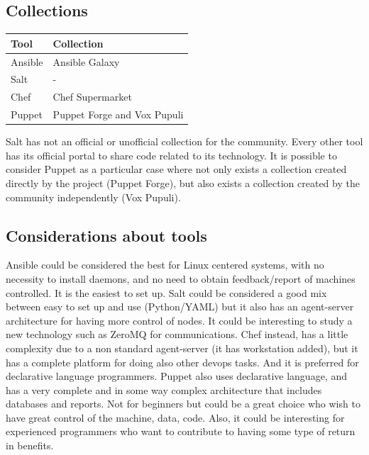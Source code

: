 \documentclass[12pt,a4paper,openright,twoside]{book}
\begin{document}
\subsection{Collections}
\begin{table}[H]
    \begin{tabular}{|l|l|}
    \hline
    \textbf{Tool} & \textbf{Collection}                            \\ \hline
    Ansible       & Ansible Galaxy                                 \\ \hline
    Salt          & -                                              \\ \hline
    Chef          & Chef Supermarket                               \\ \hline
    Puppet        & Puppet Forge and Vox Pupuli                    \\ \hline
    \end{tabular}
\end{table}
Salt has not an official or unofficial collection for the community.
Every other tool has its official portal to share code related to its technology.
It is possible to consider Puppet as a particular case where not only exists a collection created directly by the project (Puppet Forge), but also exists a collection created by the community independently (Vox Pupuli).

\subsection{Considerations about tools}
Ansible could be considered the best for Linux centered systems, with no necessity to install daemons, and no need to obtain feedback/report of machines controlled. It is the easiest to set up.
Salt could be considered a good mix between easy to set up and use (Python/YAML) but it also has an agent-server architecture for having more control of nodes. It could be interesting to study a new technology such as ZeroMQ for communications.
Chef instead, has a little complexity due to a non standard agent-server (it has workstation added), but it has a complete platform for doing also other devops tasks. And it is preferred for declarative language programmers.
Puppet also uses declarative language, and has a very complete and in some way complex architecture that includes databases and reports. Not for beginners but could be a great choice who wish to have great control of the machine, data, code. Also, it could be interesting for experienced programmers who want to contribute to having some type of return in benefits.
\end{document}
